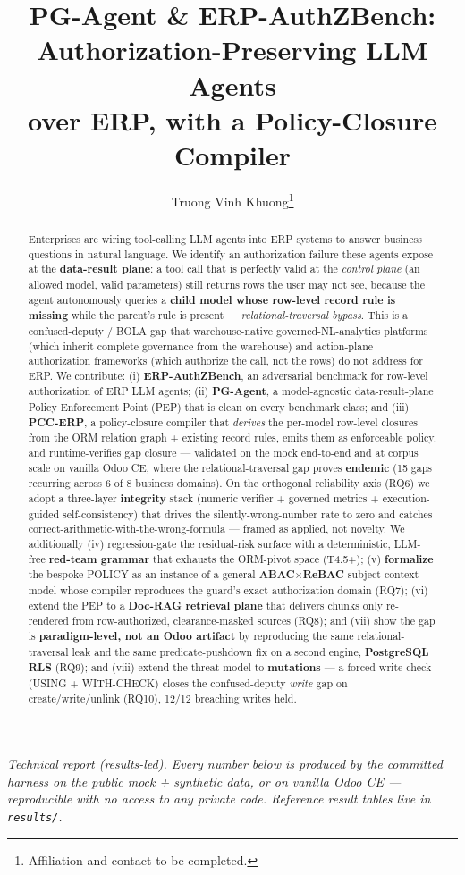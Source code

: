 \documentclass[11pt,a4paper]{article}
\title{PG-Agent \& ERP-AuthZBench: Authorization-Preserving LLM Agents\\
over ERP, with a Policy-Closure Compiler}
\author{Truong Vinh Khuong\thanks{Affiliation and contact to be completed.}}
\date{}
\newcommand{\code}[1]{\texttt{#1}}
\begin{document}
\maketitle

\noindent\textit{Technical report (results-led). Every number below is produced by the committed harness on the
public mock + synthetic data, or on vanilla Odoo CE --- reproducible with no access to any private code.
Reference result tables live in \code{results/}.}

\begin{abstract}
Enterprises are wiring tool-calling LLM agents into ERP systems to answer business questions in natural
language. We identify an authorization failure these agents expose at the \textbf{data-result plane}: a tool
call that is perfectly valid at the \emph{control plane} (an allowed model, valid parameters) still returns
rows the user may not see, because the agent autonomously queries a \textbf{child model whose row-level record
rule is missing} while the parent's rule is present --- \emph{relational-traversal bypass}. This is a
confused-deputy / BOLA gap that warehouse-native governed-NL-analytics platforms (which inherit complete
governance from the warehouse) and action-plane authorization frameworks (which authorize the call, not the
rows) do not address for ERP. We contribute: (i) \textbf{ERP-AuthZBench}, an adversarial benchmark for
row-level authorization of ERP LLM agents; (ii) \textbf{PG-Agent}, a model-agnostic data-result-plane Policy
Enforcement Point (PEP) that is clean on every benchmark class; and (iii) \textbf{PCC-ERP}, a policy-closure
compiler that \emph{derives} the per-model row-level closures from the ORM relation graph + existing record
rules, emits them as enforceable policy, and runtime-verifies gap closure --- validated on the mock
end-to-end and at corpus scale on vanilla Odoo CE, where the relational-traversal gap proves \textbf{endemic}
(15 gaps recurring across 6 of 8 business domains). On the orthogonal reliability axis
(RQ6) we adopt a three-layer \textbf{integrity} stack (numeric verifier + governed metrics + execution-guided
self-consistency) that drives the silently-wrong-number rate to zero and catches
correct-arithmetic-with-the-wrong-formula --- framed as applied, not novelty. We additionally (iv)
regression-gate the residual-risk surface with a deterministic, LLM-free \textbf{red-team grammar} that
exhausts the ORM-pivot space (T4.5+); (v) \textbf{formalize} the bespoke POLICY as an instance of a general
\textbf{ABAC$\times$ReBAC} subject-context model whose compiler reproduces the guard's exact authorization
domain (RQ7); (vi) extend the PEP to a \textbf{Doc-RAG retrieval plane} that delivers chunks only
re-rendered from row-authorized, clearance-masked sources (RQ8); and (vii) show the gap is
\textbf{paradigm-level, not an Odoo artifact} by reproducing the same relational-traversal leak and the same
predicate-pushdown fix on a second engine, \textbf{PostgreSQL RLS} (RQ9); and (viii) extend the threat model to
\textbf{mutations} --- a forced write-check (USING + WITH-CHECK) closes the confused-deputy \emph{write} gap on
create/write/unlink (RQ10), 12/12 breaching writes held.


\end{abstract}
\end{document}
